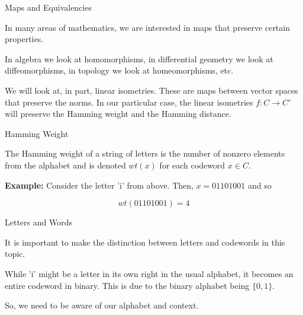 \documentclass{beamer}
\begin{document}
\begin{frame}{Maps and Equivalencies}
    
    In many areas of mathematics, we are interested in maps that preserve certain properties.

    \medskip

    In algebra we look at homomorphisms, in differential geometry we look at diffeomorphisms, in
    topology we look at homeomorphisms, etc.

    \bigskip

    \pause

    We will look at, in part, linear isometries. These are maps between vector spaces that preserve the
    norms. In our particular case, the linear isometries $f:C\to C'$ will preserve the Hamming weight
    and the Hamming distance.

\end{frame}

\begin{frame}{Hamming Weight}
    
    The Hamming weight of a string of letters is the number of nonzero elements from the alphabet and is
    denoted $wt(x)$ for each codeword $x\in C$.

    \medskip

    \pause

    \textbf{Example:} Consider the letter 'i' from above. Then, $x=01101001$ and so

    $$wt(01101001)=4$$

\end{frame}

\begin{frame}{Letters and Words}

    It is important to make the distinction between letters and codewords in this topic.
    
    \bigskip

    While 'i' might be a letter in its own right in the usual alphabet, it becomes an entire codeword
    in binary. This is due to the binary alphabet being $\{0,1\}$.

    \bigskip

    \pause

    So, we need to be aware of our alphabet and context.
    
\end{frame}
\end{document}
